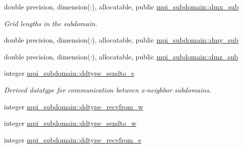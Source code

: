\textbf{ }\par
\begin{DoxyCompactItemize}
\item 
double precision, dimension(\+:), allocatable, public \hyperlink{namespacempi__subdomain_a56af1740899dc9df6868e5e71a0884a5}{mpi\+\_\+subdomain\+::dmx\+\_\+sub}
\begin{DoxyCompactList}\small\item\em Grid lengths in the subdomain. \end{DoxyCompactList}\item 
double precision, dimension(\+:), allocatable, public \hyperlink{namespacempi__subdomain_ae44efbff9669bfad03a79ab41b5e8ace}{mpi\+\_\+subdomain\+::dmy\+\_\+sub}
\item 
double precision, dimension(\+:), allocatable, public \hyperlink{namespacempi__subdomain_afb6341d7362587d6fd0a06fe78ba4e3f}{mpi\+\_\+subdomain\+::dmz\+\_\+sub}
\end{DoxyCompactItemize}

\textbf{ }\par
\begin{DoxyCompactItemize}
\item 
integer \hyperlink{namespacempi__subdomain_a93395266b1630e5a91e8e89531dfcec6}{mpi\+\_\+subdomain\+::ddtype\+\_\+sendto\+\_\+e}
\begin{DoxyCompactList}\small\item\em Derived datatype for communication between x-\/neighbor subdomains. \end{DoxyCompactList}\item 
integer \hyperlink{namespacempi__subdomain_a0b2a4ab6d6a88a3817f473a5c2c172b9}{mpi\+\_\+subdomain\+::ddtype\+\_\+recvfrom\+\_\+w}
\item 
integer \hyperlink{namespacempi__subdomain_a0701fde01daea1a6fd51b62c75b8ee82}{mpi\+\_\+subdomain\+::ddtype\+\_\+sendto\+\_\+w}
\item 
integer \hyperlink{namespacempi__subdomain_a18a84c0f3ca27cd4dd73057ff035f341}{mpi\+\_\+subdomain\+::ddtype\+\_\+recvfrom\+\_\+e}
\end{DoxyCompactItemize}

